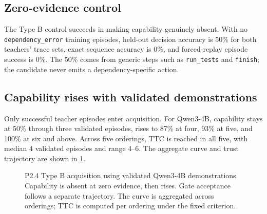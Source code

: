 \documentclass[10pt]{article}
\begin{document}
\subsection{Zero-evidence control}

The Type B control succeeds in making capability genuinely absent. With no \texttt{dependency\_error} training episodes, held-out decision accuracy is 50\% for both teachers' trace sets, exact sequence accuracy is 0\%, and forced-replay episode success is 0\%. The 50\% comes from generic steps such as \texttt{run\_tests} and \texttt{finish}; the candidate never emits a dependency-specific action.

\subsection{Capability rises with validated demonstrations}

Only successful teacher episodes enter acquisition. For Qwen3-4B, capability stays at 50\% through three validated episodes, rises to 87\% at four, 93\% at five, and 100\% at six and above. Across five orderings, TTC is reached in all five, with median 4 validated episodes and range 4--6. The aggregate curve and trust trajectory are shown in \cref{fig:curve}.

\begin{figure}[t]
\centering
{}
\caption{P2.4 Type B acquisition using validated Qwen3-4B demonstrations. Capability is absent at zero evidence, then rises. Gate acceptance follows a separate trajectory. The curve is aggregated across orderings; TTC is computed per ordering under the fixed criterion.}
\label{fig:curve}
\end{figure}
\end{document}
